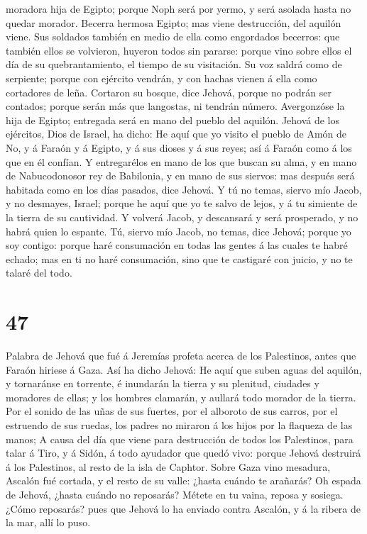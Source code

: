 moradora hija de Egipto; porque Noph será por yermo, y será asolada
hasta no quedar morador.  Becerra hermosa Egipto; mas viene
destrucción, del aquilón viene.  Sus soldados también en
medio de ella como engordados becerros: que también ellos se volvieron,
huyeron todos sin pararse: porque vino sobre ellos el día de su
quebrantamiento, el tiempo de su visitación.  Su voz saldrá
como de serpiente; porque con ejército vendrán, y con hachas vienen á
ella como cortadores de leña.  Cortaron su bosque, dice
Jehová, porque no podrán ser contados; porque serán más que langostas,
ni tendrán número.  Avergonzóse la hija de Egipto;
entregada será en mano del pueblo del aquilón.  Jehová de
los ejércitos, Dios de Israel, ha dicho: He aquí que yo visito el pueblo
de Amón de No, y á Faraón y á Egipto, y á sus dioses y á sus reyes; así
á Faraón como á los que en él confían.  Y entregarélos en
mano de los que buscan su alma, y en mano de Nabucodonosor rey de
Babilonia, y en mano de sus siervos: mas después será habitada como en
los días pasados, dice Jehová.  Y tú no temas, siervo mío
Jacob, y no desmayes, Israel; porque he aquí que yo te salvo de lejos, y
á tu simiente de la tierra de su cautividad. Y volverá Jacob, y
descansará y será prosperado, y no habrá quien lo espante. 
Tú, siervo mío Jacob, no temas, dice Jehová; porque yo soy contigo:
porque haré consumación en todas las gentes á las cuales te habré
echado; mas en ti no haré consumación, sino que te castigaré con juicio,
y no te talaré del todo.

\hypertarget{section-46}{%
\section{47}\label{section-46}}

 Palabra de Jehová que fué á Jeremías profeta acerca de los
Palestinos, antes que Faraón hiriese á Gaza.  Así ha dicho
Jehová: He aquí que suben aguas del aquilón, y tornaránse en torrente, é
inundarán la tierra y su plenitud, ciudades y moradores de ellas; y los
hombres clamarán, y aullará todo morador de la tierra.  Por
el sonido de las uñas de sus fuertes, por el alboroto de sus carros, por
el estruendo de sus ruedas, los padres no miraron á los hijos por la
flaqueza de las manos;  A causa del día que viene para
destrucción de todos los Palestinos, para talar á Tiro, y á Sidón, á
todo ayudador que quedó vivo: porque Jehová destruirá á los Palestinos,
al resto de la isla de Caphtor.  Sobre Gaza vino mesadura,
Ascalón fué cortada, y el resto de su valle: ¿hasta cuándo te arañarás?
 Oh espada de Jehová, ¿hasta cuándo no reposarás? Métete en
tu vaina, reposa y sosiega.  ¿Cómo reposarás? pues que
Jehová lo ha enviado contra Ascalón, y á la ribera de la mar, allí lo
puso.

